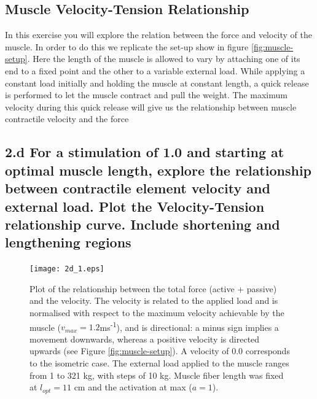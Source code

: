\documentclass{cmc}
\begin{document}
\subsection*{Muscle Velocity-Tension Relationship}
In this exercise you will explore the relation between the force and
velocity of the muscle. In order to do this we replicate the set-up
show in figure \ref{fig:muscle-setup}. Here the length of the muscle is
allowed to vary by attaching one of its end to a fixed point and the
other to a variable external load. While applying a constant load
initially and holding the muscle at constant length, a quick release
is performed to let the muscle contract and pull the weight. The
maximum velocity during this quick release will give us the
relationship between muscle contractile velocity and the force

\subsection*{2.d For a stimulation of 1.0 and starting at optimal
  muscle length, explore the relationship between contractile element
  velocity and external load. Plot the Velocity-Tension relationship
  curve. Include shortening and lengthening regions}

\begin{figure}[H]
\centering
\texttt{[image: 2d\_1.eps]}
\caption{Plot of the relationship between the total force (active + passive) and the velocity. The velocity is related to the applied load and is normalised with respect to the maximum velocity achievable by the muscle ($v_{max}=1.2$ms\textsuperscript{-1}), and is directional: a minus sign implies a movement downwards, whereas a positive velocity is directed upwards (see Figure \ref{fig:muscle-setup}). A velocity of 0.0 corresponds to the isometric case. The external load applied to the muscle ranges from 1 to 321 kg, with steps of 10 kg. Muscle fiber length was fixed at $l_{opt} = 11$ cm and the activation at max ($a=1$).}
\label{figure:2d1}
\end{figure}
\end{document}
